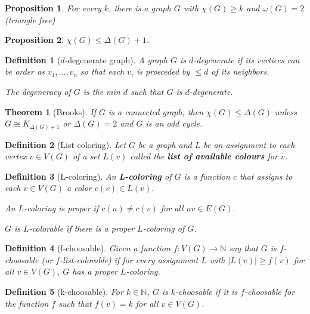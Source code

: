\documentclass{article}
\newcommand{\N}{\mathbb{N}}
\newcommand{\size}[1]{|#1|}
\newcommand{\st}{such that }
\newtheorem*{definition}{Definition}
\newtheorem*{proposition}{Proposition}
\newtheorem*{theorem}{Theorem}
\begin{document}
\begin{proposition}
    For every $ k $, there is a graph $ G $ with $ \chi(G) \geq k $ and $ \omega(G) = 2 $ (triangle free)
\end{proposition}

\begin{proposition}
    $ \chi(G) \leq \Delta(G) + 1 $.
\end{proposition}

\begin{definition}[$d$-degenerate graph]
    A graph $ G $ is $ d $-degenerate if its vertices can be order as $ v_1, \dots, v_n $ so that each $ v_i $ is proeceded by $ \leq d $ of its
    neighbors.

    The degeneracy of $ G $ is the min $ d $ \st $ G $ is $ d $-degenerate.
\end{definition}

\begin{theorem}[Brooks]
    If $ G $ is a connected graph, then $ \chi(G) \leq \Delta(G) $ unless $ G \cong K_{\Delta(G) + 1} $ or $ \Delta(G) = 2 $ and $ G $ is an odd cycle.
\end{theorem}

\begin{definition}[List coloring]
    Let $ G $ be a graph and $ L $ be an assignment to each vertex $ v \in V(G) $ of a set $ L(v) $ called the \textbf{list of available colours} for
    $ v $.
\end{definition}

\begin{definition}[L-coloring]
    An \textbf{L-coloring} of $ G $ is a function $ c $ that assigns to each $ v \in V(G) $ a color $ c(v) \in L(v) $.

    An $ L $-coloring is proper if $ c(u) \neq c(v) $ for all $ uv \in E(G) $.

    $ G $ is $ L $-colorable if there is a proper $ L $-coloring of $ G $.
\end{definition}

\begin{definition}[f-choosable]
    Given a function $ f: V(G) \to \N $ say that $ G $ is $ f $-choosable  (or $ f $-list-colorable) if for every assignment $ L $ with
    $ \size{L(v)} \geq f(v) $ for all $ v \in V(G) $, $ G $ has a proper $ L $-coloring.
\end{definition}

\begin{definition}[k-choosable]
    For $ k \in \N $, $ G $ is $ k $-choosable if it is $ f $-choosable for the function $ f $ \st $ f(v) = k $ for all $ v \in V(G) $.
\end{definition}
\end{document}
